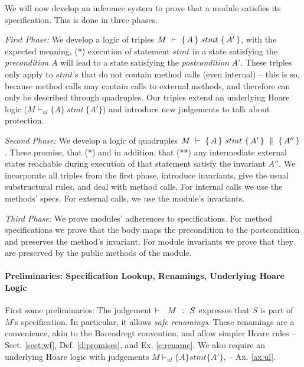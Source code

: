 We will now develop an inference system to prove that a module %
satisfies its specification. This is done in three phases.

\textit{First Phase:} We develop a logic of triples ${M\ \vdash\ \{\,A\, \} \ stmt\  \{\,A'\, \} }$,  with %
the expected meaning, \ie 
(*) execution of statement $stmt$ in a state satisfying {the \emph{precondition}}  $A$ will lead to a state satisfying  {the \emph{postcondition}}  $A'$.
These triples only apply to   $stmt$'s  that  do not contain method calls  (even internal) -- this is so, because method calls may contain calls to external methods, and therefore can only be described through quadruples.
Our triples extend an underlying Hoare logic  (${M \vdash_{ul}  \{A\} {\ stmt\ } \{A'\} }$) and  introduce new judgements to %
talk about protection.

\textit{Second Phase:} We develop a logic of quadruples ${M\ \vdash\ \{\,A\, \} \ stmt\  \{\,A'\, \}\, \,\parallel\,\, \{\, A'' \, \}}$. These promise,  that (*) and  
in addition,   that (**) any intermediate external states reachable during execution of that statement %
 satisfy the invariant  $A''$.  
 We incorporate all triples from the first phase,       
introduce invariants, give the usual substructural rules, and deal with method calls. 
For internal   calls we use the methods' specs. %
For external   calls, we   use %
 the module's invariants. 
 
\textit{Third Phase:} We prove modules' adherences to  specifications. 
For method specifications we prove that the body maps the precondition to the postcondition and preserves the method's invariant. 
For module invariants we prove that they  are preserved by the public methods of the module.



\paragraph{Preliminaries: Specification Lookup,  Renamings, Underlying Hoare Logic}

First some preliminaries: %
The judgement    ${\vdash \ \ M\ \ \mathbf{:}\ \ S}$ expresses that $S$ is part of $M$'s specification.  
In particular, it allows   \emph{safe  renamings}. 
These renamings are   a convenience, akin to the Barendregt convention, and  allow simpler Hoare rules  -- \cf Sect. \ref{sect:wf},
Def. \ref{d:promises}, and Ex. \ref{e:rename}. We also require an underlying Hoare logic with judgements $M \vdash_{ul} \{ A \} stmt \{ A' \}$, 
-- \cf Ax. \ref{ax:ul}.



